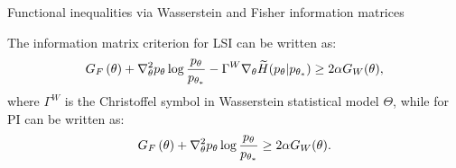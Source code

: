 \documentclass{beamer}
\begin{document}
\begin{frame}{Functional inequalities via Wasserstein and Fisher information matrices}
    \begin{theorem}\label{RIW}
    The information matrix criterion for LSI can be written as:
    \begin{equation*}
        G_F\left( \theta \right) +  \nabla_{\theta}^2p_\theta\log \frac{p_\theta}{p_{\theta_*}} - \Gamma^W \nabla_{\theta}\widetilde H(p_\theta|p_{\theta_*}) \geq 2\alpha G_W(\theta),
    \end{equation*}
    where $\Gamma^W$ is the Christoffel symbol in Wasserstein statistical model $\Theta$, while for PI can be written as:
    \begin{equation*}
        G_F\left( \theta \right) +  \nabla_{\theta}^2p_\theta\log \frac{p_\theta}{p_{\theta_*}} \geq 2\alpha G_W(\theta).
    \end{equation*}
\end{theorem}
\end{frame}
\end{document}
